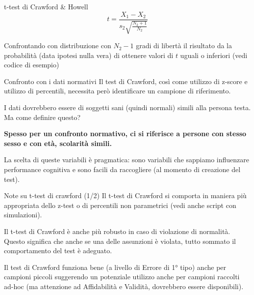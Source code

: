 \documentclass[
  ignorenonframetext,
]{beamer}
\begin{document}

\begin{frame}{t-test di Crawford \& Howell}
\label{t-test-di-crawford-howell}
\[
t = \frac{X_1 - X_2}{s_2\sqrt{\frac{N_2+1}{N_2}}}
\]

\vspace{1em}

Confrontando con distribuzione con \(N_2-1\) gradi di libertà il
risultato da la probabilità (data ipotesi nulla vera) di ottenere valori
di \(t\) uguali o inferiori (vedi codice di esempio)
\end{frame}

\begin{frame}{Confronto con i dati normativi}
\label{confronto-con-i-dati-normativi}
Il test di Crawford, così come utilizzo di z-score e utilizzo di
percentili, necessita però identificare un campione di riferimento.

I dati dovrebbero essere di soggetti sani (quindi normali) simili alla
persona testa. Ma come definire questo?

\textbf{Spesso per un confronto normativo, ci si riferisce a persone con
stesso sesso e con età, scolarità simili.}

La scelta di queste variabili è pragmatica: sono variabili che sappiamo
influenzare performance cognitiva e sono facili da raccogliere (al
momento di creazione del test).
\end{frame}

\begin{frame}{Note su t-test di crawford (1/2)}
\label{note-su-t-test-di-crawford-12}
Il t-test di Crawford si comporta in maniera più appropriata dello
z-test o di percentili non parametrici (vedi anche script con
simulazioni).

Il t-test di Crawford è anche più robusto in caso di violazione di
normalità. Questo significa che anche se una delle assunzioni è violata,
tutto sommato il comportamento del test è adeguato.

Il test di Crawford funziona bene (a livello di Errore di 1° tipo) anche
per campioni piccoli suggerendo un potenziale utilizzo anche per
campioni raccolti ad-hoc (ma attenzione ad Affidabilità e Validità,
dovrebbero essere disponibili).
\end{frame}
\end{document}
